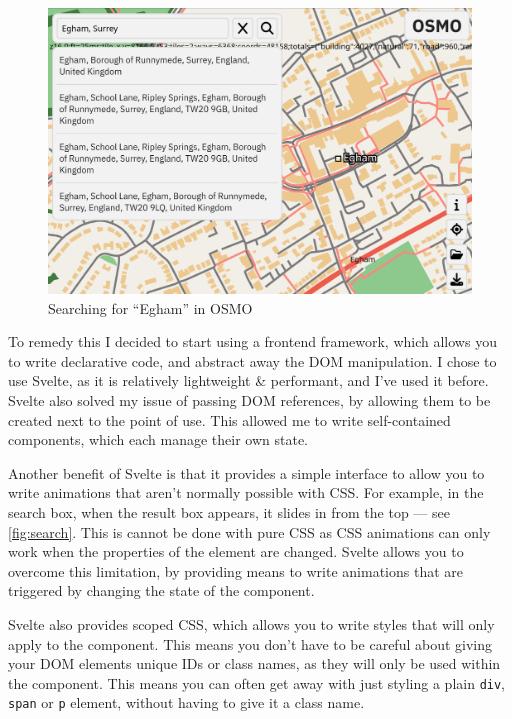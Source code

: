 \documentclass[hyphens]{final_report}
\begin{document}
\begin{figure}[ht]
    \centering
    \includegraphics[width=\textwidth]{images/search.png}
    \caption{Searching for ``Egham'' in OSMO}\label{fig:search}
\end{figure}


To remedy this I decided to start using a frontend framework, which allows you to write declarative code, and abstract away the DOM manipulation. I chose to use Svelte, as it is relatively lightweight \& performant, and I've used it before. Svelte also solved my issue of passing DOM references, by allowing them to be created next to the point of use. This allowed me to write self-contained components, which each manage their own state. 

Another benefit of Svelte is that it provides a simple interface to allow you to write animations that aren't normally possible with CSS\@. For example, in the search box, when the result box appears, it slides in from the top --- see \autoref{fig:search}. This is cannot be done with pure CSS as CSS animations can only work when the properties of the element are changed. Svelte allows you to overcome this limitation, by providing means to write animations that are triggered by changing the state of the component.

Svelte also provides scoped CSS, which allows you to write styles that will only apply to the component. This means you don't have to be careful about giving your DOM elements unique IDs or class names, as they will only be used within the component. This means you can often get away with just styling a plain \texttt{div}, \texttt{span} or \texttt{p} element, without having to give it a class name. 
\end{document}

